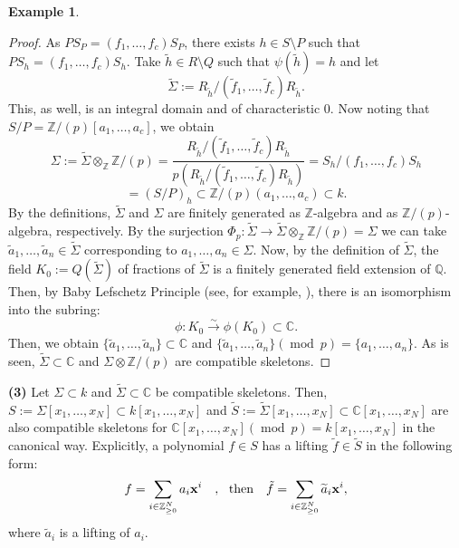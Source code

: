 \documentclass[a4paper]{amsart}
\def\CC{{\mathbb{C}}}
\def\QQ{{\mathbb{Q}}}
\def\ZZ{{\mathbb{Z}}}
\renewcommand{\th}{{\tilde{h}}}
\newcommand{\tf}{{\tilde f}}
\newcommand{\ta}{{\widetilde{a}}}
\newcommand{\ws}{{\widetilde{S}}}
\newcommand{\wsig}{{\widetilde{\Sigma}}}
\newcommand{\zp}{{\ZZ/(p)}}
\renewcommand{\mod}{{\operatorname{mod}\ }}
\theoremstyle{definition}
\newtheorem{ex}[thm]{Example}
\begin{document}
\begin{ex}
\begin{proof}
  
    
    As $PS_P=(f_1,\ldots,f_c)S_P$, there exists $h\in S\setminus P$ such that 
    $PS_h=(f_1,\ldots,f_c)S_h$.
    Take $\th\in R\setminus Q$ such that $\psi(\th)=h$ and let
    $$\widetilde\Sigma:=R_\th/(\tf_1,\ldots,\tf_c)R_\th.$$
   This, as well, is an integral domain and of characteristic $0$.
    Now noting that $S/P=\zp[a_1,\ldots, a_c]$, we obtain
    $$\Sigma:=\widetilde\Sigma\otimes_\ZZ\zp=\frac{R_\th/(\tf_1,\ldots,\tf_c)R_\th}
    {p({R_\th/(\tf_1,\ldots,\tf_c)R_\th})}
    =S_h/(f_1,\ldots,f_c)S_h$$
    $$=(S/P)_h\subset 
    \zp(a_1,\ldots,a_c) \subset k.$$
  By the definitions, $\wsig$ and $\Sigma$ are finitely generated as $\ZZ$-algebra and as $\zp$-algebra, respectively.
    By the surjection $\Phi_p:\widetilde\Sigma\to \widetilde\Sigma\otimes_\ZZ\zp=\Sigma$
    we can take $\widetilde{a}_1, \ldots, \widetilde{a}_n\in \widetilde\Sigma$
    corresponding to $a_1,\ldots, a_n\in \Sigma$.
     Now, by the definition of $\widetilde\Sigma$, the field $K_0:=Q(\widetilde\Sigma)$ of fractions of $\widetilde\Sigma$ is
     a finitely generated field extension of $\QQ$.
     Then, by Baby Lefschetz Principle (see, for example, \cite[Proposition 4]{tao}), 
     there is an isomorphism into the subring:
     $$\phi: K_0 \stackrel{\sim}\longrightarrow \phi(K_0)\subset \CC.$$
     Then, we obtain 
     $\{\widetilde a_1,\ldots, \widetilde a_n\}\subset \CC$
      and $\{\widetilde a_1,\ldots, \widetilde a_n\} (\mod p)=\{a_1,\ldots, a_n\}$.
%      
      As is seen, $\wsig\subset \CC$ and $\Sigma\otimes \zp$ are compatible skeletons.
\end{proof}
     
\noindent      
{\bf(3)}  Let $\Sigma\subset k$ and $\wsig \subset \CC$ be  compatible skeletons.
      Then, $S:=\Sigma[x_1,\ldots,x_N]\subset 
      k[x_1,\ldots,x_N]$ and  $\ws:= \wsig[x_1,\ldots,x_N]\subset \CC[x_1,\ldots,x_N]$
      are  also compatible skeletons for $\CC[x_1,\ldots,x_N] (\mod p)= k[x_1,\ldots,x_N]$
      in the canonical way.
      Explicitly, a polynomial $f\in S$ has a lifting $\tf\in \ws$ in the following form:
          $$f=\sum_{i\in \ZZ^N_{\geq 0}} a_i{\bold{x}}^i\ \ \  ,\ \ \mbox{then}\ \ \ \tf=\sum_{i\in \ZZ^N_{\geq 0}} \ta_i\bold{x}^i,$$
    where $\ta_i$ is a lifting of $a_i$.
\end{ex}
\end{document}
